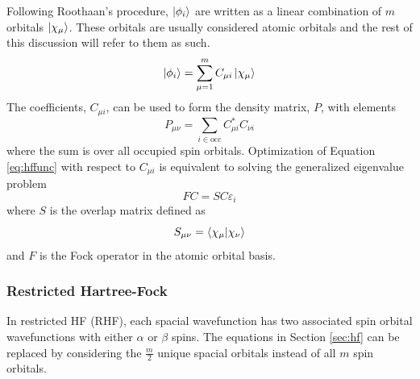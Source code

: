 \documentclass[final,3p,times,twocolumn]{elsarticle}
\begin{document}
Following Roothaan's procedure,\cite{roothaan} $\ket{\phi_i}$ are written as a linear combination of $m$ orbitals $\ket{\chi_\mu}$. These orbitals are usually considered atomic orbitals and the rest of this discussion will refer to them as such.
\begin{equation} \label{eq:lcao}
\ket{\phi_i} = \sum_{\mu=1}^m C_{\mu i} \ket{\chi_\mu}
\end{equation}
The coefficients, $C_{\mu i}$, can be used to form the density matrix, $P$, with elements
\begin{equation} \label{eq:density}
P_{\mu \nu} = \sum_{i\in\text{occ}} C_{\mu i}^*C_{\nu i}
\end{equation}
where the sum is over all occupied spin orbitals. Optimization of Equation \eqref{eq:hffunc} with respect to $C_{\mu i}$ is equivalent to solving the generalized eigenvalue problem 
\begin{equation}\label{eq:fock}
FC = SC\varepsilon_i
\end{equation}
where $S$ is the overlap matrix defined as
\begin{equation}
S_{\mu \nu} = \bra{\chi_\mu}\ket{\chi_\nu}
\end{equation}
and $F$ is the Fock operator in the atomic orbital basis. %

\subsubsection{Restricted Hartree-Fock} \label{sec:rhf}
In restricted HF (RHF), each spacial wavefunction has two associated spin orbital wavefunctions with either $\alpha$ or $\beta$ spins. The equations in Section \ref{sec:hf} can be replaced by considering the $\frac{m}{2}$ unique spacial orbitals instead of all $m$ spin orbitals.
\end{document}
